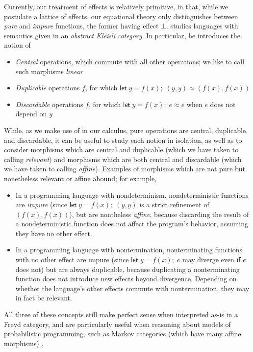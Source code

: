 \documentclass[acmsmall,screen,review]{acmart}
\newcommand{\ms}[1]{\ensuremath{\mathsf{#1}}}
\newcommand{\letexpr}[3]{\ensuremath{\ms{let}\;#1 = #2;\;#3}}
\newcommand{\teqv}{\approx}
\begin{document}
Currently, our treatment of effects is relatively primitive, in that, while we postulate a lattice
of effects, our equational theory only distinguishes between \emph{pure} and \emph{impure}
functions, the former having effect $\bot$. \citet{fuhrmann-direct-1999} studies languages with
semantics given in an \emph{abstract Kleisli category}. In particular, he introduces the notion of
\begin{itemize}
  \item \emph{Central} operations, which commute with all other operations; we like to call such
  morphisms \emph{linear}
  \item \emph{Duplicable} operations $f$, for which $\letexpr{y}{f(x)}{(y, y)} \teqv (f(x), f(x))$
  \item \emph{Discardable} operations $f$, for which $\letexpr{y}{f(x)}{e} \teqv e$ when $e$ does
  not depend on $y$
\end{itemize}
While, as we make use of in our calculus, pure operations are central, duplicable, and discardable,
it can be useful to study each notion in isolation, as well as to consider morphisms which are
central and duplicable (which we have taken to calling \emph{relevant}) and morphisms which are
both central and discardable (which we have taken to calling \emph{affine}). Examples of morphisms
which are not pure but nonetheless relevant or affine abound; for example,
\begin{itemize}
  \item In a programming language with nondeterminism, nondeterministic functions are \emph{impure}
  (since $\letexpr{y}{f(x)}{(y, y)}$ is a strict refinement of $(f(x), f(x))$), but are nontheless
  \emph{affine}, because discarding the result of a nondeterministic function does not affect the
  program's behavior, assuming they have no other effect.
  \item In a programming language with nontermination, nonterminating functions with no other effect
  are impure (since $\letexpr{y}{f(x)}{e}$ may diverge even if $e$ does not) but are always
  duplicable, because duplicating a nonterminating function does not introduce new effects beyond
  divergence. Depending on whether the language's other effects commute with nontermination, they
  may in fact be relevant.
\end{itemize}
All three of these concepts still make perfect sense when interpreted as-is in a Freyd category, and
are particularly useful when reasoning about models of probabilistic programming, such as Markov
categories (which have many affine morphisms) \cite{nlab:markov-category}.
\end{document}
